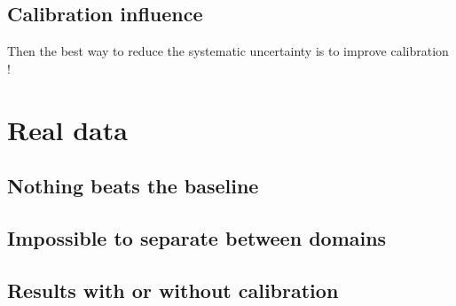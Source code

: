 







\subsection{Calibration influence} %
\label{sub:calibration_influence}

Then the best way to reduce the systematic uncertainty is to improve calibration !








\section{Real data} %
\label{sec:real_data}










\subsection{Nothing beats the baseline} %
\label{sub:nothing_beats_the_baseline}








\subsection{Impossible to separate between domains} %
\label{sub:impossible_to_separate_between_domains}










\subsection{Results with or without calibration} %
\label{sub:results_with_or_without_calibration}

